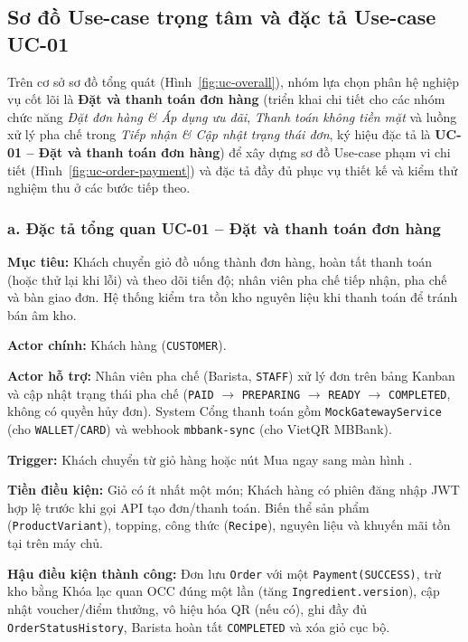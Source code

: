 \documentclass[12pt,a4paper]{report}
\begin{document}
\subsection{Sơ đồ Use-case trọng tâm và đặc tả Use-case UC-01}

Trên cơ sở sơ đồ tổng quát (Hình~\ref{fig:uc-overall}), nhóm lựa chọn phân hệ nghiệp vụ cốt lõi là \textbf{Đặt và thanh toán đơn hàng} (triển khai chi tiết cho các nhóm chức năng \textit{Đặt đơn hàng \& Áp dụng ưu đãi}, \textit{Thanh toán không tiền mặt} và luồng xử lý pha chế trong \textit{Tiếp nhận \& Cập nhật trạng thái đơn}, ký hiệu đặc tả là \textbf{UC-01 -- Đặt và thanh toán đơn hàng}) để xây dựng sơ đồ Use-case phạm vi chi tiết (Hình~\ref{fig:uc-order-payment}) và đặc tả đầy đủ phục vụ thiết kế và kiểm thử nghiệm thu ở các bước tiếp theo.

\subsubsection*{a. Đặc tả tổng quan UC-01 -- Đặt và thanh toán đơn hàng}

\noindent\textbf{Mục tiêu:} Khách chuyển giỏ đồ uống thành đơn hàng, hoàn tất thanh toán (hoặc thử lại khi lỗi) và theo dõi tiến độ; nhân viên pha chế tiếp nhận, pha chế và bàn giao đơn. Hệ thống kiểm tra tồn kho nguyên liệu khi thanh toán để tránh bán âm kho.

\medskip
\noindent\textbf{Actor chính:} Khách hàng (\texttt{CUSTOMER}).

\medskip
\noindent\textbf{Actor hỗ trợ:} Nhân viên pha chế (Barista, \texttt{STAFF}) xử lý đơn trên bảng Kanban và cập nhật trạng thái pha chế (\texttt{PAID} $\rightarrow$ \texttt{PREPARING} $\rightarrow$ \texttt{READY} $\rightarrow$ \texttt{COMPLETED}, không có quyền hủy đơn). \guillemotleft{}System\guillemotright{} Cổng thanh toán gồm \texttt{MockGatewayService} (cho \texttt{WALLET}/\texttt{CARD}) và webhook \texttt{mbbank-sync} (cho VietQR MBBank).

\medskip
\noindent\textbf{Trigger:} Khách chuyển từ giỏ hàng hoặc nút Mua ngay sang màn hình .

\medskip
\noindent\textbf{Tiền điều kiện:} Giỏ có ít nhất một món; Khách hàng có phiên đăng nhập JWT hợp lệ trước khi gọi API tạo đơn/thanh toán. Biến thể sản phẩm (\texttt{ProductVariant}), topping, công thức (\texttt{Recipe}), nguyên liệu và khuyến mãi tồn tại trên máy chủ.

\medskip
\noindent\textbf{Hậu điều kiện thành công:} Đơn lưu \texttt{Order} với một \texttt{Payment(SUCCESS)}, trừ kho bằng Khóa lạc quan OCC đúng một lần (tăng \texttt{Ingredient.version}), cập nhật voucher/điểm thưởng, vô hiệu hóa QR (nếu có), ghi đầy đủ \texttt{OrderStatusHistory}, Barista hoàn tất \texttt{COMPLETED} và xóa giỏ cục bộ.
\end{document}
